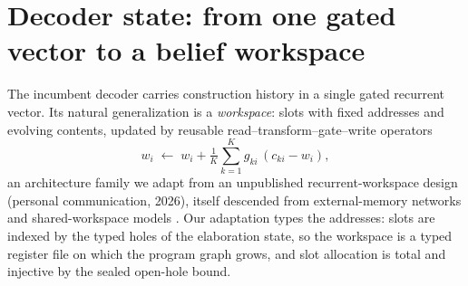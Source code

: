 \documentclass[11pt]{article}
\begin{document}
\section{Decoder state: from one gated vector to a belief workspace}
\label{sec:state}

The incumbent decoder carries construction history in a single gated recurrent vector.
Its natural generalization is a \emph{workspace}: slots with fixed addresses and
evolving contents, updated by reusable read--transform--gate--write operators
\begin{equation}
w_i \;\leftarrow\; w_i + \tfrac{1}{K}\sum_{k=1}^{K} g_{ki}\,(c_{ki}-w_i),
\label{eq:workspace}
\end{equation}
an architecture family we adapt from an unpublished recurrent-workspace design
(personal communication, 2026), itself descended from external-memory networks and
shared-workspace models \cite{goyal2021}. Our adaptation types the addresses: slots are
indexed by the typed holes of the elaboration state, so the workspace is a typed
register file on which the program graph grows, and slot allocation is total and
injective by the sealed open-hole bound.
\end{document}
